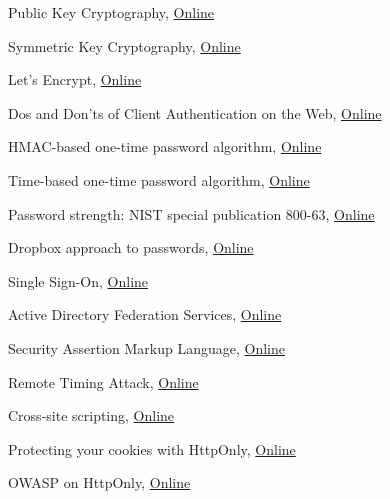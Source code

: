 \documentclass[a4paper,12pt,oneside,openright]{memoir}
\begin{document}
%
%
\begin{thebibliography}{5}

 Public Key Cryptography,
\href{http://en.wikipedia.org/wiki/Public-key_cryptography}{Online}

 Symmetric Key Cryptography,
\href{http://en.wikipedia.org/wiki/Symmetric-key_algorithm}{Online}

 Let's Encrypt,
\href{https://letsencrypt.org}{Online}

 Dos and Don'ts of Client Authentication on the Web,
\href{https://pdos.csail.mit.edu/papers/webauth:sec10.pdf}{Online}

 HMAC-based one-time password algorithm,
\href{https://en.wikipedia.org/wiki/HMAC-based_One-time_Password_algorithm}{Online}

 Time-based one-time password algorithm,
\href{https://en.wikipedia.org/wiki/Time-based_One-time_Password_algorithm}{Online}

 Password strength: NIST special publication 800-63,
\href{http://en.wikipedia.org/wiki/Password_strength#NIST_Special_Publication_800-63}{Online}

 Dropbox approach to passwords,
\href{https://blogs.dropbox.com/tech/2012/04/zxcvbn-realistic-password-strength-estimation}{Online}

 Single Sign-On,
\href{https://en.wikipedia.org/wiki/Single_sign-on}{Online}

 Active Directory Federation Services,
\href{https://en.wikipedia.org/wiki/Active_Directory_Federation_Services}{Online}

 Security Assertion Markup Language,
\href{https://en.wikipedia.org/wiki/Security_Assertion_Markup_Language}{Online}

 Remote Timing Attack,
\href{http://en.wikipedia.org/wiki/Timing_attack}{Online}

 Cross-site scripting,
\href{http://en.wikipedia.org/wiki/Cross-site_scripting}{Online}

 Protecting your cookies with HttpOnly,
\href{http://blog.codinghorror.com/protecting-your-cookies-httponly/}{Online}

 OWASP on HttpOnly,
\href{https://www.owasp.org/index.php/HttpOnly}{Online}



\end{thebibliography}
%
\end{document}
